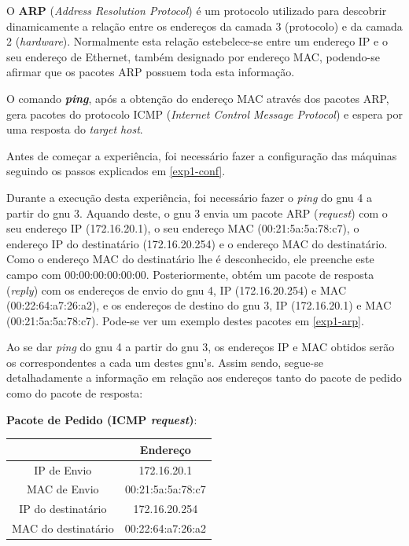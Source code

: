 \documentclass[article, a4paper, 11pt, oneside]{memoir}
\begin{document}
O \textbf{ARP} (\textit{Address Resolution Protocol}) é um protocolo utilizado para descobrir 
dinamicamente a relação entre os endereços da camada 3 (protocolo) e da camada 2 
(\textit{hardware}). Normalmente esta relação estebelece-se entre um endereço IP e o seu
endereço de Ethernet, também designado por endereço MAC, podendo-se afirmar que
os pacotes ARP possuem toda esta informação.

O comando \textbf{\textit{ping}}, após a obtenção do endereço MAC através dos pacotes ARP, gera
pacotes do protocolo ICMP (\textit{Internet Control Message Protocol}) e espera por uma
resposta do \textit{target host}.

Antes de começar a experiência, foi necessário fazer a configuração das máquinas seguindo os passos
explicados em \ref{exp1-conf}.

Durante a execução desta experiência, foi necessário fazer o \textit{ping} do gnu 4 a partir do gnu 3.
Aquando deste, o gnu 3 envia um pacote ARP (\textit{request}) com o seu endereço IP (172.16.20.1),
o seu endereço MAC (00:21:5a:5a:78:c7), o endereço IP do destinatário (172.16.20.254)
e o endereço MAC do destinatário. Como o endereço MAC do destinatário lhe é desconhecido,
ele preenche este campo com 00:00:00:00:00:00. Posteriormente, obtém um pacote de resposta
(\textit{reply}) com os endereços de envio do gnu 4, IP (172.16.20.254) e MAC (00:22:64:a7:26:a2),
e os endereços de destino do gnu 3, IP (172.16.20.1) e MAC (00:21:5a:5a:78:c7).
Pode-se ver um exemplo destes pacotes em \ref{exp1-arp}.

Ao se dar \textit{ping} do gnu 4 a partir do gnu 3, os endereços IP e MAC obtidos serão
os correspondentes a cada um destes gnu's. Assim sendo, segue-se detalhadamente a informação
em relação aos endereços tanto do pacote de pedido como do pacote de resposta:

\textbf{Pacote de Pedido (ICMP \textit{request})}:

\begin{tabular}{||c c||} 
  \hline
    & Endereço \\ [0.5ex] 
  \hline\hline
  IP de Envio & 172.16.20.1  \\ 
  \hline
  MAC de Envio & 00:21:5a:5a:78:c7 \\
  \hline
  IP do destinatário & 172.16.20.254 \\
  \hline
  MAC do destinatário & 00:22:64:a7:26:a2 \\ [1ex] 
  \hline
\end{tabular}
\end{document}
